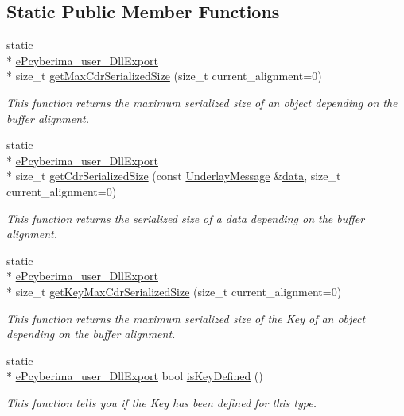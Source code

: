 \subsection*{Static Public Member Functions}
\begin{DoxyCompactItemize}
\item 
static \\*
\hyperlink{underlay__message_8h_a72796233f09f587d949ca1aa9842453d}{e\-Pcyberima\-\_\-user\-\_\-\-Dll\-Export} \\*
size\-\_\-t \hyperlink{classapollo_1_1cyber_1_1transport_1_1UnderlayMessage_aa32ad9979da8d083a9b143f5cdb1f893}{get\-Max\-Cdr\-Serialized\-Size} (size\-\_\-t current\-\_\-alignment=0)
\begin{DoxyCompactList}\small\item\em This function returns the maximum serialized size of an object depending on the buffer alignment. \end{DoxyCompactList}\item 
static \\*
\hyperlink{underlay__message_8h_a72796233f09f587d949ca1aa9842453d}{e\-Pcyberima\-\_\-user\-\_\-\-Dll\-Export} \\*
size\-\_\-t \hyperlink{classapollo_1_1cyber_1_1transport_1_1UnderlayMessage_a8c0d81fd8225ee981f4fc192fb1d48fd}{get\-Cdr\-Serialized\-Size} (const \hyperlink{classapollo_1_1cyber_1_1transport_1_1UnderlayMessage}{Underlay\-Message} \&\hyperlink{classapollo_1_1cyber_1_1transport_1_1UnderlayMessage_a8c0257458aca2f88a7875719d638b6bd}{data}, size\-\_\-t current\-\_\-alignment=0)
\begin{DoxyCompactList}\small\item\em This function returns the serialized size of a data depending on the buffer alignment. \end{DoxyCompactList}\item 
static \\*
\hyperlink{underlay__message_8h_a72796233f09f587d949ca1aa9842453d}{e\-Pcyberima\-\_\-user\-\_\-\-Dll\-Export} \\*
size\-\_\-t \hyperlink{classapollo_1_1cyber_1_1transport_1_1UnderlayMessage_a116720df2e10c44955cc619e54b775a1}{get\-Key\-Max\-Cdr\-Serialized\-Size} (size\-\_\-t current\-\_\-alignment=0)
\begin{DoxyCompactList}\small\item\em This function returns the maximum serialized size of the Key of an object depending on the buffer alignment. \end{DoxyCompactList}\item 
static \\*
\hyperlink{underlay__message_8h_a72796233f09f587d949ca1aa9842453d}{e\-Pcyberima\-\_\-user\-\_\-\-Dll\-Export} bool \hyperlink{classapollo_1_1cyber_1_1transport_1_1UnderlayMessage_aabbe3243e7f147da98057a0a2e1d622c}{is\-Key\-Defined} ()
\begin{DoxyCompactList}\small\item\em This function tells you if the Key has been defined for this type. \end{DoxyCompactList}\end{DoxyCompactItemize}
